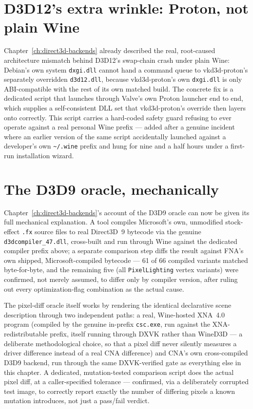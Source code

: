 \section{D3D12's extra wrinkle: Proton, not plain Wine}

Chapter~\ref{ch:direct3d-backends} already described the real, root-caused
architecture mismatch behind D3D12's swap-chain crash under plain Wine: Debian's own system
\texttt{dxgi.dll} cannot hand a command queue to vkd3d-proton's separately overridden
\texttt{d3d12.dll}, because vkd3d-proton's own \texttt{dxgi.dll} is only ABI-compatible with
the rest of its own matched build. The concrete fix is a dedicated script that launches
through Valve's own Proton launcher end to end, which supplies a self-consistent DLL set that
vkd3d-proton's override then layers onto correctly. This script carries a hard-coded safety
guard refusing to ever operate against a real personal Wine prefix --- added after a genuine
incident where an earlier version of the same script accidentally launched against a
developer's own \texttt{\textasciitilde/.wine} prefix and hung for nine and a half hours
under a first-run installation wizard.

\section{The D3D9 oracle, mechanically}
\label{sec:d3d9-oracle}

Chapter~\ref{ch:direct3d-backends}'s account of the D3D9 oracle can now be given its full
mechanical explanation. A tool compiles Microsoft's own, unmodified stock-effect \texttt{.fx}
source files to real Direct3D~9 bytecode via the genuine \texttt{d3dcompiler\_47.dll},
cross-built and run through Wine against the dedicated compiler prefix above; a separate
comparison step diffs the result against FNA's own shipped, Microsoft-compiled bytecode ---
61 of 66 compiled variants matched byte-for-byte, and the remaining five (all
\texttt{PixelLighting} vertex variants) were confirmed, not merely assumed, to differ only by
compiler version, after ruling out every optimization-flag combination as the actual cause.

The pixel-diff oracle itself works by rendering the identical declarative scene description
through two independent paths: a real, Wine-hosted XNA~4.0 program (compiled by the genuine
in-prefix \texttt{csc.exe}, run against the XNA-redistributable prefix, itself running
through DXVK rather than WineD3D --- a deliberate methodological choice, so that a pixel diff
never silently measures a driver difference instead of a real CNA difference) and CNA's own
cross-compiled D3D9 backend, run through the same DXVK-verified gate as everything else in
this chapter. A dedicated, mutation-tested comparison script does the actual pixel diff, at
a caller-specified tolerance --- confirmed, via a deliberately corrupted test image, to
correctly report exactly the number of differing pixels a known mutation introduces, not just
a pass/fail verdict.

